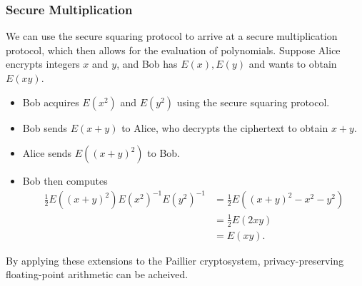 \subsubsection{Secure Multiplication}
We can use the secure squaring protocol to arrive at a secure multiplication protocol, which then allows for the evaluation of polynomials.
Suppose Alice encrypts integers $x$ and $y$, and Bob has $E\left(x\right), E\left(y\right)$ and wants to obtain $E\left(xy\right)$.
\begin{itemize}
	\item Bob acquires $E\left(x^2\right)$ and $E\left(y^2\right)$ using the secure squaring protocol.
	\item Bob sends $E\left(x+y\right)$ to Alice, who decrypts the ciphertext to obtain $x+y$.
	\item Alice sends $E\left(\left(x+y\right)^2\right)$ to Bob.
	\item Bob then computes
	\begin{align*}
		\frac{1}{2}E\left(\left(x+y\right)^2\right)E\left(x^2\right)^{-1}E\left(y^2\right)^{-1} &= \frac{1}{2}E\left(\left(x+y\right)^2 - x^2 - y^2\right)\\
		&= \frac{1}{2}E\left(2xy\right)\\
		&= E\left(xy\right).
	\end{align*}
\end{itemize}

By applying these extensions to the Paillier cryptosystem, privacy-preserving floating-point arithmetic can be acheived.
